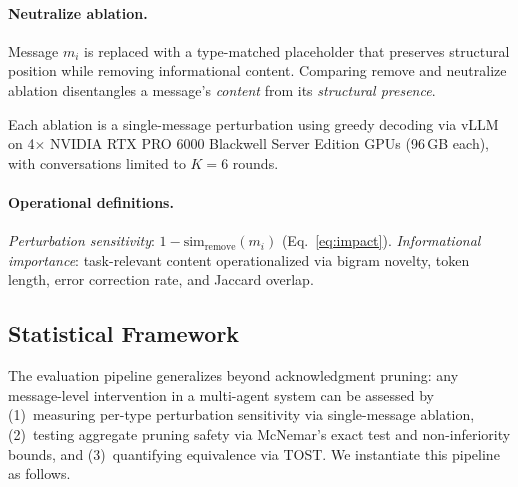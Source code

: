 \paragraph{Neutralize ablation.} Message $m_i$ is replaced with a type-matched placeholder that preserves structural position while removing informational content. Comparing remove and neutralize ablation disentangles a message's \emph{content} from its \emph{structural presence}.

Each ablation is a single-message perturbation using greedy decoding via vLLM~\cite{kwon_vllm_2023} on 4$\times$ NVIDIA RTX PRO 6000 Blackwell Server Edition GPUs (96\,GB each), with conversations limited to $K = 6$ rounds.

\paragraph{Operational definitions.} \emph{Perturbation sensitivity}: $1 - \text{sim}_{\text{remove}}(m_i)$ (Eq.~\ref{eq:impact}). \emph{Informational importance}: task-relevant content operationalized via bigram novelty, token length, error correction rate, and Jaccard overlap.

\subsection{Statistical Framework}
\label{sec:statistical_framework}

The evaluation pipeline generalizes beyond acknowledgment pruning: any message-level intervention in a multi-agent system can be assessed by (1)~measuring per-type perturbation sensitivity via single-message ablation, (2)~testing aggregate pruning safety via McNemar's exact test and non-inferiority bounds, and (3)~quantifying equivalence via TOST. We instantiate this pipeline as follows.

